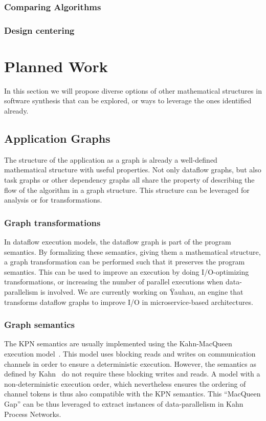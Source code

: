 \documentclass[sigplan,10pt]{acmart}
\begin{document}
\subsubsection{Comparing Algorithms}
\subsubsection{Design centering}

\section{Planned Work}

In this section we will propose diverse options of other mathematical structures in software synthesis that can be explored, or ways to leverage the ones identified already.

\subsection{Application Graphs}

The structure of the application as a graph is already a well-defined mathematical structure with useful properties.
Not only dataflow graphs, but also task graphs or other dependency graphs all share the property of describing the flow of the algorithm in a graph structure.
This structure can be leveraged for analysis or for transformations.

\subsubsection{Graph transformations}
In dataflow execution models, the dataflow graph is part of the program semantics. By formalizing these semantics, giving them a mathematical structure, a graph transformation can be performed such that it preserves the program semantics.
This can be used to improve an execution by doing I/O-optimizing transformations, or increasing the number of parallel executions when data-parallelism is involved.
We are currently working on \"Yauhau, an engine that transforms dataflow graphs to improve I/O in microservice-based architectures. 

\subsubsection{Graph semantics}
The KPN semantics are usually implemented using the Kahn-MacQueen execution model~\cite{kahnmacqueen}. This model uses blocking reads and writes on communication channels in order to ensure a deterministic execution.
However, the semantics as defined by Kahn~\cite{kahn74} do not require these blocking writes and reads. A model with a non-deterministic execution order, which nevertheless ensures the ordering of channel tokens is thus also compatible with the KPN semantics.
This ``MacQueen Gap'' can be thus leveraged to extract instances of data-parallelism in Kahn Process Networks.
\end{document}
